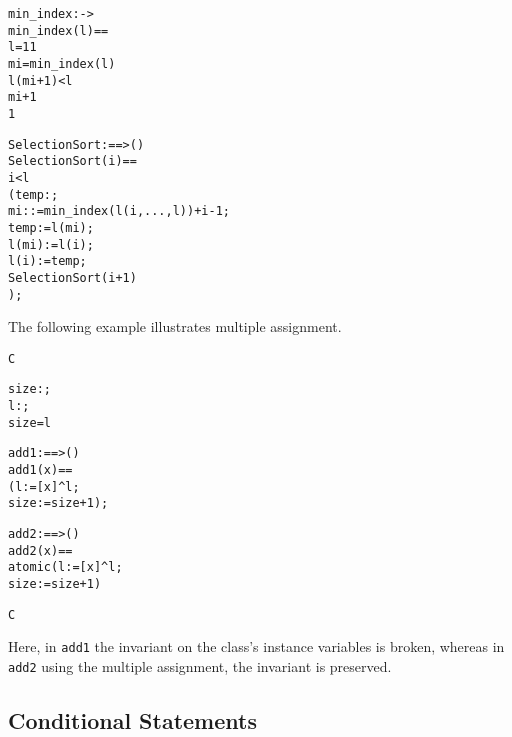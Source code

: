 \documentclass[\pformat,12pt]{article}
\begin{document}
\begin{description}
\begin{alltt}
  min_index :  -> 
  min_index(l) ==
   l = 1  1
   mi = min_index( l)
      l(mi+1) <  l
        mi+1
        1


  SelectionSort :  ==> ()
  SelectionSort (i) ==
     i <  l
     ( temp: ;
          mi :  := min_index(l(i,..., l)) + i - 1;
         temp := l(mi);
         l(mi) := l(i);
         l(i) := temp;
         SelectionSort(i+1)
        );
  \end{alltt}
  The following example illustrates multiple assignment.
  \begin{alltt}
   C

      size : ;
      l : ;
     size =  l

      add1 :  ==> ()
      add1 (x) ==
         ( l := [x] ^ l;
           size := size + 1);

      add2 :  ==> ()
      add2 (x) ==
         atomic (l := [x] ^ l;
                 size := size + 1)

   C
  \end{alltt}
Here, in \texttt{add1} the invariant on the class's instance variables
is broken, whereas in \texttt{add2} using the multiple assignment, the
invariant is preserved.

\end{description}

\subsection{Conditional Statements}\label{condstmt}
\end{document}
